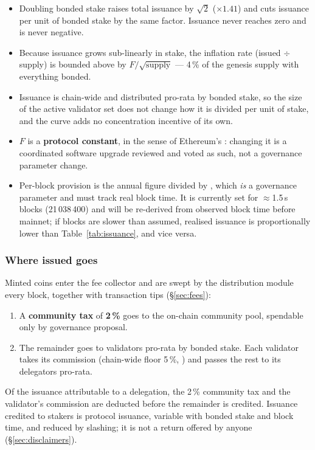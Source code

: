 \begin{itemize}
\item Doubling bonded stake raises total issuance by $\sqrt{2}$ ($\times 1.41$)
  and cuts issuance per unit of bonded stake by the same factor. Issuance never
  reaches zero and is never negative.
\item Because issuance grows sub-linearly in stake, the inflation rate
  (issued $\div$ supply) is bounded above by $F / \sqrt{\text{supply}}$ ---
  4\,\% of the genesis supply with everything bonded.
\item Issuance is chain-wide and distributed pro-rata by bonded stake, so the
  size of the active validator set does not change how it is divided per unit
  of stake, and the curve adds no concentration incentive of its own.
\item $F$ is a \textbf{protocol constant}, in the sense of Ethereum's
  : changing it is a coordinated software upgrade
  reviewed and voted as such, not a governance parameter change.
\item Per-block provision is the annual figure divided by ,
  which \emph{is} a governance parameter and must track real block time. It is
  currently set for $\approx$1.5\,s blocks (21\,038\,400) and will be re-derived
  from observed  block time before mainnet; if blocks are
  slower than assumed, realised issuance is proportionally lower than
  Table~\ref{tab:issuance}, and vice versa.
\end{itemize}

\subsubsection{Where issued \kash{} goes}

Minted coins enter the fee collector and are swept by the distribution module
every block, together with transaction tips (\S\ref{sec:fees}):

\begin{enumerate}
\item A \textbf{community tax} of \textbf{2\,\%} goes to the on-chain community
  pool, spendable only by governance proposal.
\item The remainder goes to validators pro-rata by bonded stake. Each validator
  takes its commission (chain-wide floor 5\,\%, ) and passes the rest to
  its delegators pro-rata.
\end{enumerate}

Of the issuance attributable to a delegation, the 2\,\% community tax and
the validator's commission are deducted before the remainder is credited.
Issuance credited to stakers is protocol issuance, variable with bonded stake
and block time, and reduced by slashing; it is not a return offered by anyone
(\S\ref{sec:disclaimers}).


